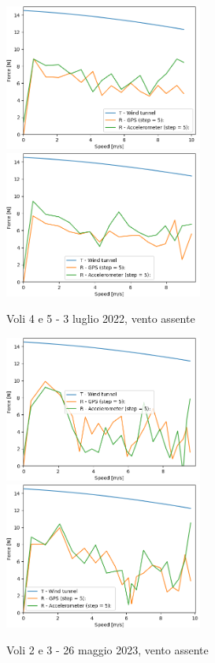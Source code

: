 \documentclass[12pt]{article}
\begin{document}
\begin{figure}[!h]
	\centering
	\includegraphics[width=6.5cm]{img/TvsR-6-4-c}
	\includegraphics[width=6.5cm]{img/TvsR-6-5-c}
	\captionsetup{labelformat=empty}
	\caption{Voli 4 e 5 - 3 luglio 2022, vento assente}
\end{figure}
\vspace{-0.8cm}
\begin{figure}[!h]
	\centering
	\includegraphics[width=6.5cm]{img/TvsR-7-2-c}
	\includegraphics[width=6.5cm]{img/TvsR-7-3-c}
	\captionsetup{labelformat=empty}
	\caption{Voli 2 e 3 - 26 maggio 2023, vento assente}
\end{figure}
\end{document}
